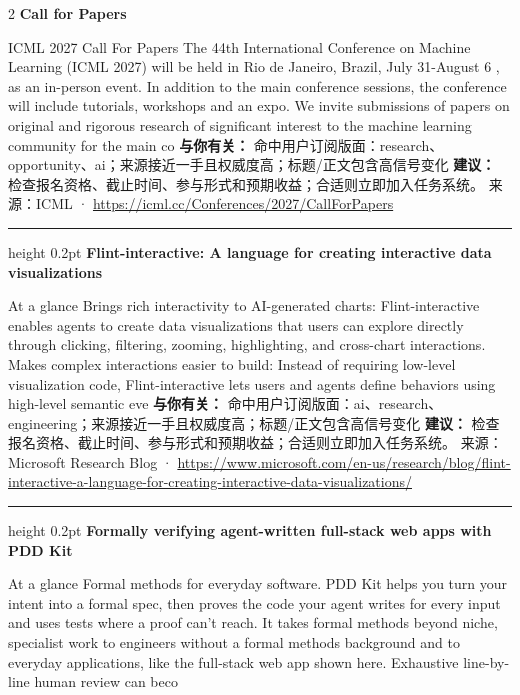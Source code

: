\documentclass[10.5pt]{ctexart}
\begin{document}
\begin{multicols}{2}
{\large\bfseries Call for Papers}\par
ICML 2027 Call For Papers The 44th International Conference on Machine Learning (ICML 2027) will be held in Rio de Janeiro, Brazil, July 31-August 6 , as an in-person event. In addition to the main conference sessions, the conference will include tutorials, workshops and an expo. We invite submissions of papers on original and rigorous research of significant interest to the machine learning community for the main co
\textbf{与你有关：} 命中用户订阅版面：research、opportunity、ai；来源接近一手且权威度高；标题/正文包含高信号变化
\textbf{建议：} 检查报名资格、截止时间、参与形式和预期收益；合适则立即加入任务系统。
{\footnotesize\color{ormuted} 来源：ICML · \url{https://icml.cc/Conferences/2027/CallForPapers}}
\vspace{2mm}
\hrule height 0.2pt
\vspace{2mm}
{\large\bfseries Flint-interactive: A language for creating interactive data visualizations}\par
At a glance Brings rich interactivity to AI-generated charts: Flint-interactive enables agents to create data visualizations that users can explore directly through clicking, filtering, zooming, highlighting, and cross-chart interactions. Makes complex interactions easier to build: Instead of requiring low-level visualization code, Flint-interactive lets users and agents define behaviors using high-level semantic eve
\textbf{与你有关：} 命中用户订阅版面：ai、research、engineering；来源接近一手且权威度高；标题/正文包含高信号变化
\textbf{建议：} 检查报名资格、截止时间、参与形式和预期收益；合适则立即加入任务系统。
{\footnotesize\color{ormuted} 来源：Microsoft Research Blog · \url{https://www.microsoft.com/en-us/research/blog/flint-interactive-a-language-for-creating-interactive-data-visualizations/}}
\vspace{2mm}
\hrule height 0.2pt
\vspace{2mm}
{\large\bfseries Formally verifying agent-written full-stack web apps with PDD Kit}\par
At a glance Formal methods for everyday software. PDD Kit helps you turn your intent into a formal spec, then proves the code your agent writes for every input and uses tests where a proof can’t reach. It takes formal methods beyond niche, specialist work to engineers without a formal methods background and to everyday applications, like the full-stack web app shown here. Exhaustive line-by-line human review can beco

\end{multicols}
\end{document}
